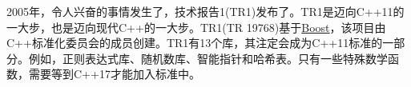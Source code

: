 

2005年，令人兴奋的事情发生了，技术报告1(TR1)发布了。TR1是迈向C++11的一大步，也是迈向现代C++的一大步。TR1(TR 19768)基于\href{https://www.boost.org/}{Boost}，该项目由C++标准化委员会的成员创建。TR1有13个库，其注定会成为C++11标准的一部分。例如，正则表达式库、随机数库、智能指针和哈希表。只有一些特殊数学函数，需要等到C++17才能加入标准中。